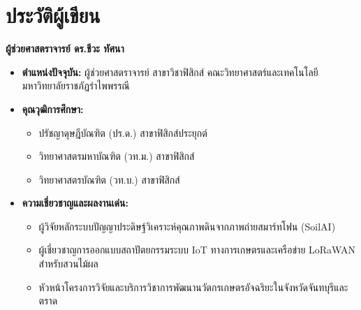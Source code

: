 \chapter{ประวัติผู้เขียน}

\begin{figure}[H]
\centering
{}
\end{figure}

\noindent\textbf{ผู้ช่วยศาสตราจารย์ ดร.ชีวะ ทัศนา}
\begin{itemize}
    \item \textbf{ตำแหน่งปัจจุบัน:} ผู้ช่วยศาสตราจารย์ สาขาวิชาฟิสิกส์ คณะวิทยาศาสตร์และเทคโนโลยี มหาวิทยาลัยราชภัฏรำไพพรรณี
    \item \textbf{คุณวุฒิการศึกษา:}
    \begin{itemize}
        \item ปรัชญาดุษฎีบัณฑิต (ปร.ด.) สาขาฟิสิกส์ประยุกต์
        \item วิทยาศาสตรมหาบัณฑิต (วท.ม.) สาขาฟิสิกส์
        \item วิทยาศาสตรบัณฑิต (วท.บ.) สาขาฟิสิกส์
    \end{itemize}
    \item \textbf{ความเชี่ยวชาญและผลงานเด่น:}
    \begin{itemize}
        \item ผู้วิจัยหลักระบบปัญญาประดิษฐ์วิเคราะห์คุณภาพดินจากภาพถ่ายสมาร์ทโฟน (SoilAI)
        \item ผู้เชี่ยวชาญการออกแบบสถาปัตยกรรมระบบ IoT ทางการเกษตรและเครือข่าย LoRaWAN สำหรับสวนไม้ผล
        \item หัวหน้าโครงการวิจัยและบริการวิชาการพัฒนานวัตกรเกษตรอัจฉริยะในจังหวัดจันทบุรีและตราด
    \end{itemize}
\end{itemize}
